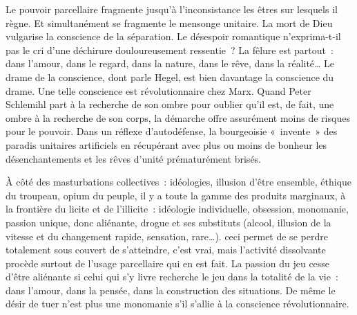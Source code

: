 \documentclass[french,twoside]{book} %
\newcommand{\astermono}{\medskip\centerline{\color{rubric}\large\selectfont{\syms ✻}}\medskip\par}%
\begin{document}
\astermono

\noindent Le pouvoir parcellaire fragmente jusqu’à l’inconsistance les êtres sur lesquels il règne. Et simultanément se fragmente le mensonge unitaire. La mort de Dieu vulgarise la conscience de la séparation. Le désespoir romantique n’exprima-t-il pas le cri d’une déchirure douloureusement ressentie ? La fêlure est partout : dans l’amour, dans le regard, dans la nature, dans le rêve, dans la réalité… Le drame de la conscience, dont parle Hegel, est bien davantage la conscience du drame. Une telle conscience est révolutionnaire chez Marx. Quand Peter Schlemihl part à la recherche de son ombre pour oublier qu’il est, de fait, une ombre à la recherche de son corps, la démarche offre assurément moins de risques pour le pouvoir. Dans un réflexe d’autodéfense, la bourgeoisie « invente » des paradis unitaires artificiels en récupérant avec plus ou moins de bonheur les désenchantements et les rêves d’unité prématurément brisés.\par
À côté des masturbations collectives : idéologies, illusion d’être ensemble, éthique du troupeau, opium du peuple, il y a toute la gamme des produits marginaux, à la frontière du licite et de l’illicite : idéologie individuelle, obsession, monomanie, passion unique, donc aliénante, drogue et ses substituts (alcool, illusion de la vitesse et du changement rapide, sensation, rare…). ceci permet de se perdre totalement sous couvert de s’atteindre, c’est vrai, mais l’activité dissolvante procède surtout de l’usage parcellaire qui en est fait. La passion du jeu cesse d’être aliénante si celui qui s’y livre recherche le jeu dans la totalité de la vie : dans l’amour, dans la pensée, dans la construction des situations. De même le désir de tuer n’est plus une monomanie s’il s’allie à la conscience révolutionnaire.\par
\end{document}
